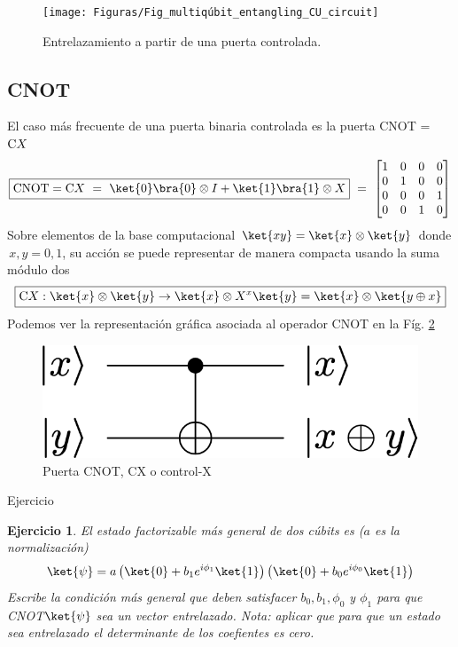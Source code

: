 \documentclass[a4paper,11pt]{book} %
\newtheorem{ejercicio_contador}{Ejercicio}
\newcommand{\Ejercicio}[1]{
		\begin{mybox_gray}{Ejercicio} 
			\begin{ejercicio_contador}
				 #1 
			\end{ejercicio_contador} 
		\end{mybox_gray}
	}
\numberwithin{equation}{chapter}
\def\lp{\left(}
\def\rp{\right)}
\newcommand{\cg}[1]{{\rm C}#1}
\begin{document}
	\begin{figure}[H]
	\centering 
	\texttt{[image: Figuras/Fig\_multiqúbit\_entangling\_CU\_circuit]}
	\caption{Entrelazamiento a partir de una puerta controlada.}
	\label{Fig_multiqúbit_entangling_CU_circuit}
	\end{figure}


        \subsection{CNOT} 
	
El caso más frecuente de una puerta binaria controlada es la puerta CNOT = $\cg{X}$
	\begin{equation} \label{ec_multiqubit_CNOT}
	\boxed{\hbox{CNOT} = \cg{X} ~=~ \ket{0}\bra{0}\otimes I + \ket{1}\bra{1}\otimes X }
	~=~ \begin{bmatrix} 1 & 0 & 0 & 0 \\ 0 & 1 & 0 & 0 \\ 0 & 0 & 0 & 1 \\ 0 & 0 & 1 & 0\end{bmatrix}
	\end{equation}
Sobre elementos de la base computacional $\ket{xy}=\ket{x}\otimes\ket{y}$ donde $\, x,y= 0,1$, su acción  se puede representar de manera compacta usando la suma módulo dos 
	\begin{equation} \label{ec_multiqubit_CNOT_compu}
	\boxed{\cg{X}:\ket{x}\otimes\ket{y} \rightarrow \ket{x} \otimes X^x\ket{y} = \ket{x} \otimes \ket{y\oplus x}}
	\end{equation}
Podemos ver la representación gráfica asociada al operador CNOT en la Fíg. \ref{Fig_multiqubit_cX_gate}
	\begin{figure}[H]
	\centering 
	\includegraphics[width=0.25\linewidth]{Figuras/Fig_multiqubit_cX_gate}
	\caption{Puerta CNOT, CX o control-X}
	\label{Fig_multiqubit_cX_gate}
	\end{figure}

	\Ejercicio{
	El estado factorizable más general de dos cúbits es ($a$ es la normalización)
	$$
	\ket{\psi} = a \left(\ket{0} + b_1 e^{i\phi_1}\ket{1} \rp \lp \ket{0} + b_0 e^{i\phi_0} \ket{1} \right) 
	$$
	Escribe la condición más general que deben satisfacer  $b_0,b_1,\phi_0$ y $\phi_1$ para que CNOT$\ket{\psi}$ 
	sea un vector entrelazado. Nota: aplicar que para que un estado sea entrelazado el determinante de los coefientes es cero.
	}
\end{document}
